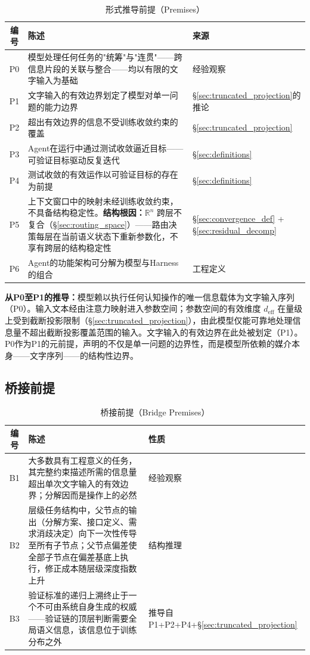 \documentclass[11pt,a4paper]{article}
\theoremstyle{definition}
\begin{document}
\begin{table}[H]
\centering
\caption{形式推导前提（Premises）}
\begin{tabular}{@{}c@{}p{7.5cm}@{}p{3.5cm}@{}}
\toprule
\textbf{编号} & \textbf{陈述} & \textbf{来源} \\
\midrule
P0 & 模型处理任何任务的"统筹"与"连贯"——跨信息片段的关联与整合——均以有限的文字输入为基础 & 经验观察 \\
P1 & 文字输入的有效边界划定了模型对单一问题的能力边界 & \S\ref{sec:truncated_projection}的推论 \\
P2 & 超出有效边界的信息不受训练收敛约束的覆盖 & \S\ref{sec:truncated_projection} \\
P3 & Agent在运行中通过测试收敛逼近目标——可验证目标驱动反复迭代 & \S\ref{sec:definitions} \\
P4 & 测试收敛的有效运作以可验证目标的存在为前提 & \S\ref{sec:definitions} \\
P5 & 上下文窗口中的映射未经训练收敛约束，不具备结构稳定性。\textbf{结构根因：}$\mathbb{R}^n$ 跨层不复合（\S\ref{sec:routing_space}）——路由决策每层在当前语义状态下重新参数化，不享有跨层的结构稳定性 & \S\ref{sec:convergence_def} + \S\ref{sec:residual_decomp} \\
P6 & Agent的功能架构可分解为模型与Harness的组合 & 工程定义 \\
\bottomrule
\end{tabular}
\end{table}

\textbf{从P0至P1的推导：}模型赖以执行任何认知操作的唯一信息载体为文字输入序列（P0）。输入文本经由注意力映射进入参数空间；参数空间的有效维度 $d_{\text{eff}}$ 在量级上受到截断投影限制（\S\ref{sec:truncated_projection}），由此模型仅能可靠地处理信息量不超出截断投影覆盖范围的输入。文字输入的有效边界在此处被划定（P1）。P0作为P1的元前提，声明的不仅是单一问题的边界性，而是模型所依赖的媒介本身——文字序列——的结构性边界。

\subsection{桥接前提}

\begin{table}[H]
\centering
\caption{桥接前提（Bridge Premises）}
\begin{tabular}{@{}c@{}p{7cm}@{}p{3cm}@{}}
\toprule
\textbf{编号} & \textbf{陈述} & \textbf{性质} \\
\midrule
B1 & 大多数具有工程意义的任务，其完整约束描述所需的信息量超出单次文字输入的有效边界；分解因而是操作上的必然 & 经验观察 \\
B2 & 层级任务结构中，父节点的输出（分解方案、接口定义、需求消歧决定）向下一次性传导至所有子节点；父节点偏差使全部子节点在偏差基底上执行，修正成本随层级深度指数上升 & 结构推理 \\
B3 & 验证标准的递归上溯终止于一个不可由系统自身生成的权威——验证链的顶层判断需要全局语义信息，该信息位于训练分布之外 & 推导自P1+P2+P4+\S\ref{sec:truncated_projection} \\
\bottomrule
\end{tabular}
\end{table}
\end{document}

